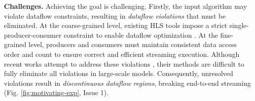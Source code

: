 \documentclass[conference]{IEEEtran}
\begin{document}


\textbf{Challenges.} Achieving the goal is challenging. Firstly, the input algorithm may violate dataflow constraints, resulting in \textit{dataflow violations} that must be eliminated. At the coarse-grained level, existing HLS tools impose a strict single-producer-consumer constraint to enable dataflow optimization \cite{hlsdataflow}. At the fine-grained level, producers and consumers must maintain consistent data access order and count to ensure correct and efficient streaming execution.
Although recent works attempt to address these violations \cite{ye2024hida, chen2024allo, streamhlsFPGA25, streamtensorMICRO25}, their methods are difficult to fully eliminate all violations in large-scale models. Consequently, unresolved violations result in \textit{discontinuous dataflow regions}, breaking end-to-end streaming (Fig. \ref{fig:motivating-exp}, Issue 1).
\end{document}

